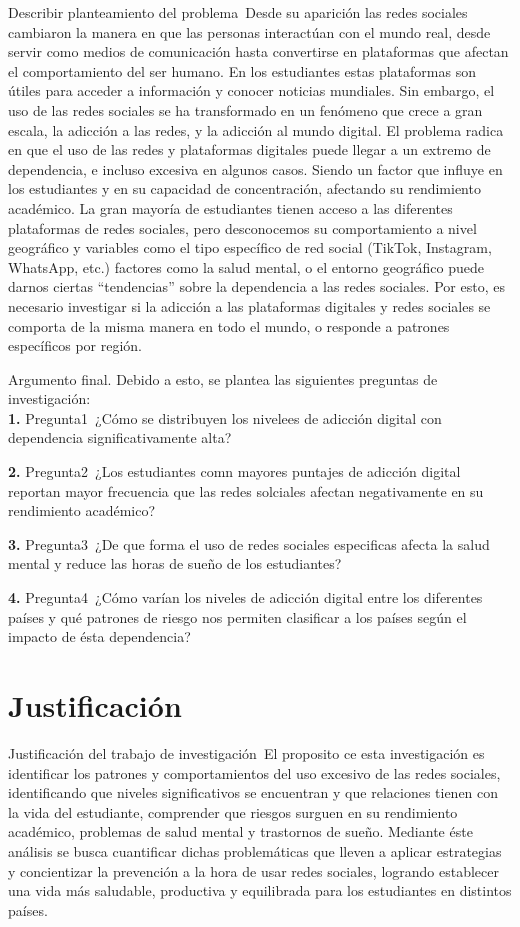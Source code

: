 \documentclass[oneside,11pt]{Latex/Classes/PhDthesisPSnPDF}
\begin{document}
Describir planteamiento del problema~Desde su aparición las redes
sociales cambiaron la manera en que las personas interactúan con el
mundo real, desde servir como medios de comunicación hasta convertirse
en plataformas que afectan el comportamiento del ser humano. En los
estudiantes estas plataformas son útiles para acceder a información y
conocer noticias mundiales. Sin embargo, el uso de las redes sociales se
ha transformado en un fenómeno que crece a gran escala, la adicción a
las redes, y la adicción al mundo digital. El problema radica en que el
uso de las redes y plataformas digitales puede llegar a un extremo de
dependencia, e incluso excesiva en algunos casos. Siendo un factor que
influye en los estudiantes y en su capacidad de concentración, afectando
su rendimiento académico. La gran mayoría de estudiantes tienen acceso a
las diferentes plataformas de redes sociales, pero desconocemos su
comportamiento a nivel geográfico y variables como el tipo específico de
red social (TikTok, Instagram, WhatsApp, etc.) factores como la salud
mental, o el entorno geográfico puede darnos ciertas ``tendencias''
sobre la dependencia a las redes sociales. Por esto, es necesario
investigar si la adicción a las plataformas digitales y redes sociales
se comporta de la misma manera en todo el mundo, o responde a patrones
específicos por región.

Argumento final. Debido a esto, se plantea las siguientes preguntas de
investigación:\\

\textbf{1.} Pregunta1~¿Cómo se distribuyen los nivelees de adicción
digital con dependencia significativamente alta?

\textbf{2.} Pregunta2~¿Los estudiantes comn mayores puntajes de adicción
digital reportan mayor frecuencia que las redes solciales afectan
negativamente en su rendimiento académico?

\textbf{3.} Pregunta3~¿De que forma el uso de redes sociales especificas
afecta la salud mental y reduce las horas de sueño de los estudiantes?

\textbf{4.} Pregunta4~¿Cómo varían los niveles de adicción digital entre
los diferentes países y qué patrones de riesgo nos permiten clasificar a
los países según el impacto de ésta dependencia?

\section{Justificación}

Justificación del trabajo de investigación~El proposito ce esta
investigación es identificar los patrones y comportamientos del uso
excesivo de las redes sociales, identificando que niveles significativos
se encuentran y que relaciones tienen con la vida del estudiante,
comprender que riesgos surguen en su rendimiento académico, problemas de
salud mental y trastornos de sueño. Mediante éste análisis se busca
cuantificar dichas problemáticas que lleven a aplicar estrategias y
concientizar la prevención a la hora de usar redes sociales, logrando
establecer una vida más saludable, productiva y equilibrada para los
estudiantes en distintos países.
\end{document}
